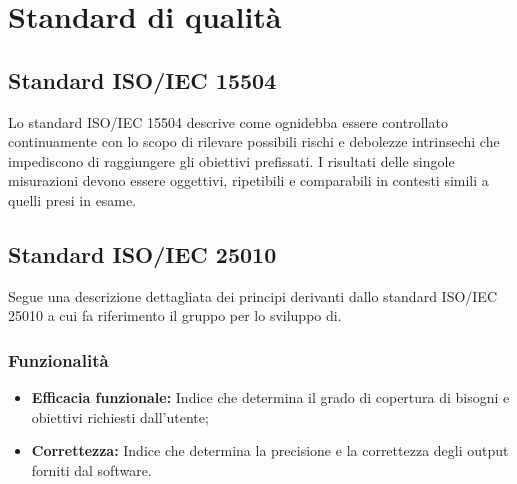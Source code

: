 \chapter{Standard di qualità}
\section{Standard ISO/IEC 15504}
Lo standard ISO/IEC 15504 descrive come ognidebba essere controllato continuamente con lo scopo di rilevare possibili rischi e debolezze intrinsechi che impediscono di raggiungere gli obiettivi prefissati. I risultati delle singole misurazioni devono essere oggettivi, ripetibili e comparabili in contesti simili a quelli presi in esame.
\section{Standard ISO/IEC 25010}
Segue una descrizione dettagliata dei principi derivanti dallo standard ISO/IEC 25010 a cui fa riferimento il gruppo per lo sviluppo di.

\subsection{Funzionalità}
\begin{itemize}
	\item \textbf{Efficacia funzionale:} Indice che determina il grado di copertura di bisogni e obiettivi richiesti dall'utente;
	\item \textbf{Correttezza:} Indice che determina la precisione e la correttezza degli output forniti dal software.
\end{itemize}
